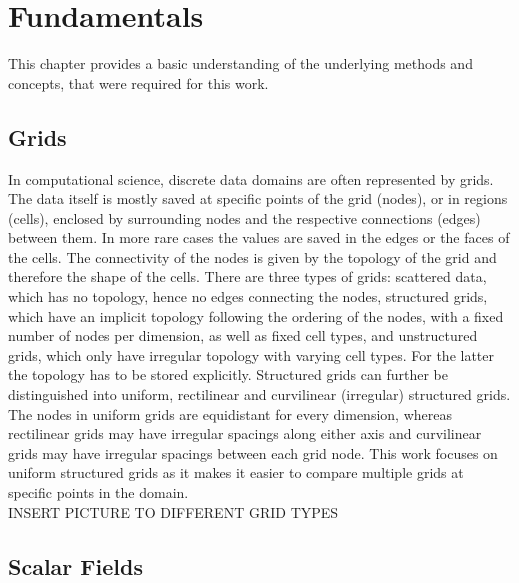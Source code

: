 \chapter{Fundamentals}

This chapter provides a basic understanding of the underlying methods
and concepts, that were required for this work.

\section{Grids}

In computational science, discrete data domains are often represented by
grids. The data itself is mostly saved at specific points of the grid 
(nodes), or in regions (cells), enclosed by surrounding nodes and the
respective connections (edges) between them. In more rare cases the
values are saved in the edges or the faces of the cells. The connectivity
of the nodes is given by the topology of the grid and therefore the shape
of the cells. There are three types of grids: scattered data, which has
no topology, hence no edges connecting the nodes, structured grids, which
have an implicit topology following the ordering of the nodes, with a
fixed number of nodes per dimension, as well as fixed cell types, and
unstructured grids, which only have irregular topology with varying cell
types. For the latter the topology has to be stored explicitly. Structured
grids can further be distinguished into uniform, rectilinear and
curvilinear (irregular) structured grids. The nodes in uniform grids are
equidistant for every dimension, whereas rectilinear grids may have irregular
spacings along either axis and curvilinear grids may have irregular spacings
between each grid node. This work focuses on uniform structured grids as
it makes it easier to compare multiple grids at specific points in the
domain.\\
INSERT PICTURE TO DIFFERENT GRID TYPES

\section{Scalar Fields}

